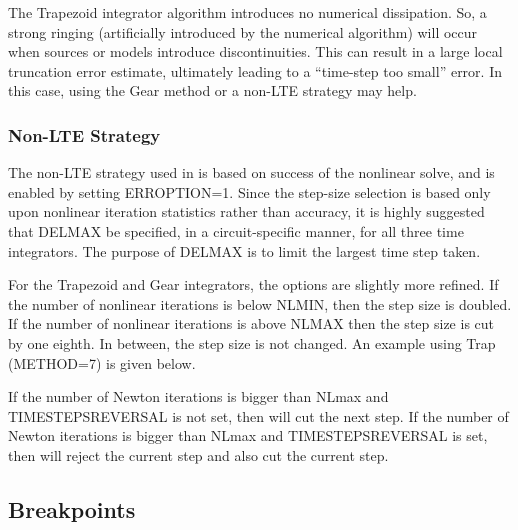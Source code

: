 The Trapezoid integrator algorithm introduces no numerical
dissipation.  So, a strong ringing (artificially introduced by the
numerical algorithm) will occur when sources or models introduce
discontinuities.  This can result in a large local truncation error
estimate, ultimately leading to a ``time-step too small'' error.  In
this case, using the Gear method or a non-LTE strategy may help.

\subsubsection{Non-LTE Strategy}
The non-LTE strategy used in \Xyce{} is based on success of the
nonlinear solve, and is enabled by setting ERROPTION=1.  Since the
step-size selection is based only upon nonlinear iteration statistics
rather than accuracy, it is highly suggested that DELMAX be specified,
in a circuit-specific manner, for all three time integrators.  The
purpose of DELMAX is to limit the largest time step taken.


For the Trapezoid and Gear integrators, the options are slightly more
refined.  If the number of nonlinear iterations is below NLMIN, then
the step size is doubled. If the number of nonlinear iterations is
above NLMAX then the step size is cut by one eighth.  In between, the
step size is not changed.  An example using Trap (METHOD=7) is given
below.  


If the number of Newton iterations is bigger than NLmax and
TIMESTEPSREVERSAL is not set, then \Xyce{} will cut the next step.  If
the number of Newton iterations is bigger than NLmax and
TIMESTEPSREVERSAL is set, then \Xyce{} will reject the current step
and also cut the current step.


\subsection{Breakpoints}

